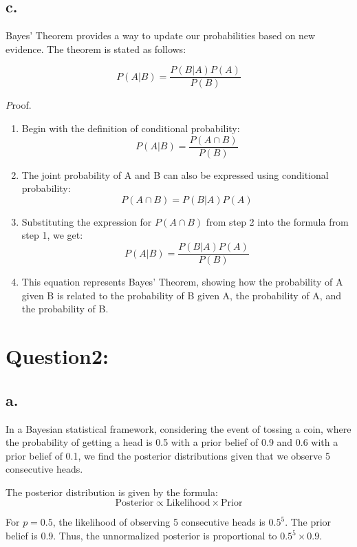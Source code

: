 \documentclass{article}
\begin{document}
\subsection*{c.}

\indent Bayes' Theorem provides a way to update our probabilities based on new 
\indent evidence. The theorem is stated as follows:

\[P(A|B) = \frac{P(B|A)P(A)}{P(B)}\]

{\small\emph Proof.}

\begin{enumerate}
    \item Begin with the definition of conditional probability:
    \[P(A|B) = \frac{P(A \cap B)}{P(B)}\]
    
    \item The joint probability of A and B can also be expressed using conditional probability:
    \[P(A \cap B) = P(B|A)P(A)\]
    
    \item Substituting the expression for \(P(A \cap B)\) from step 2 into the formula from step 1, we get:
    \[P(A|B) = \frac{P(B|A)P(A)}{P(B)}\]
    
    \item This equation represents Bayes' Theorem, showing how the probability of A given B is related to the probability of B given A, the probability of A, and the probability of B.
\end{enumerate}

\section*{Question2:}
\subsection*{a.}

In a Bayesian statistical framework, considering the event of tossing a coin, where the probability of getting a head is 0.5 with a prior belief of 0.9 and 0.6 with a prior belief of 0.1, we find the posterior distributions given that we observe 5 consecutive heads.

The posterior distribution is given by the formula:
\[ \text{Posterior} \propto \text{Likelihood} \times \text{Prior} \]

For \(p=0.5\), the likelihood of observing 5 consecutive heads is \(0.5^5\). The prior belief is 0.9. Thus, the unnormalized posterior is proportional to \(0.5^5 \times 0.9\).
\end{document}
